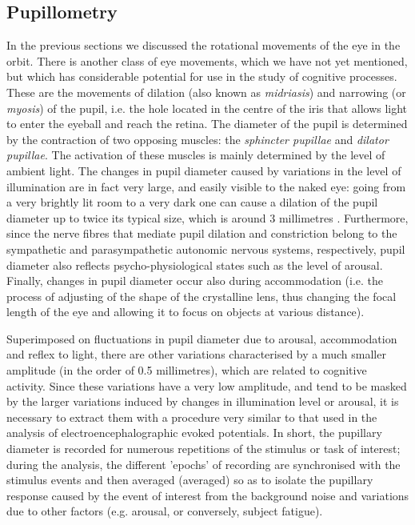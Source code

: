 \documentclass[11pt]{article}
\begin{document}
\subsection{Pupillometry}

In the previous sections we discussed the rotational movements of the eye in the orbit. There is another class of eye movements, which we have not yet mentioned, but which has considerable potential for use in the study of cognitive processes. These are the movements of dilation (also known as \textit{midriasis}) and narrowing (or \textit{myosis}) of the pupil, i.e. the hole located in the centre of the iris that allows light to enter the eyeball and reach the retina. The diameter of the pupil is determined by the contraction of two opposing muscles: the \textit{sphincter pupillae} and \textit{dilator pupillae}. The activation of these muscles is mainly determined by the level of ambient light. The changes in pupil diameter caused by variations in the level of illumination are in fact very large, and easily visible to the naked eye: going from a very brightly lit room to a very dark one can cause a dilation of the pupil diameter up to twice its typical size, which is around 3 millimetres \cite{MacLachlan2002}. Furthermore, since the nerve fibres that mediate pupil dilation and constriction belong to the sympathetic and parasympathetic autonomic nervous systems, respectively, pupil diameter also reflects psycho-physiological states such as the level of arousal. Finally, changes in pupil diameter occur also during accommodation (i.e. the process of adjusting of the shape of the crystalline lens, thus changing the focal length of the eye and allowing it to focus on objects at various distance).

Superimposed on fluctuations in pupil diameter due to arousal, accommodation and reflex to light, there are other variations characterised by a much smaller amplitude (in the order of 0.5 millimetres), which are related to cognitive activity. Since these variations have a very low amplitude, and tend to be masked by the larger variations induced by changes in illumination level or arousal, it is necessary to extract them with a procedure very similar to that used in the analysis of electroencephalographic evoked potentials. In short, the pupillary diameter is recorded for numerous repetitions of the stimulus or task of interest; during the analysis, the different 'epochs' of recording are synchronised with the stimulus events and then averaged (averaged) so as to isolate the pupillary response caused by the event of interest from the background noise and variations due to other factors (e.g. arousal, or conversely, subject fatigue).
\end{document}
